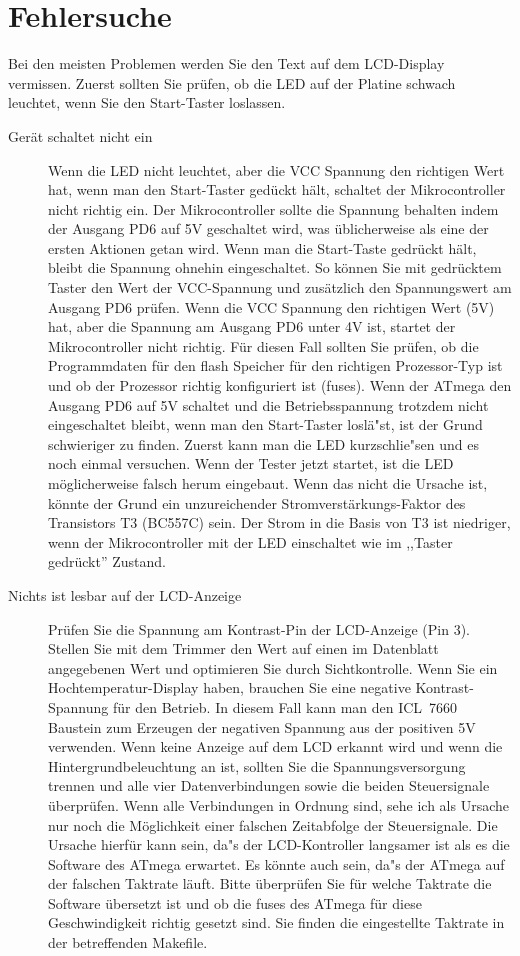 \section{Fehlersuche}
Bei den meisten Problemen werden Sie den Text auf dem LCD-Display vermissen.
Zuerst sollten Sie pr\"ufen, ob die LED auf der Platine schwach leuchtet, wenn Sie den Start-Taster
loslassen.
\begin{description}

\item[Ger\"at schaltet nicht ein]  
Wenn die LED nicht leuchtet, aber die VCC Spannung den richtigen Wert hat, wenn
man den Start-Taster ged\"uckt h\"alt, schaltet der Mikrocontroller nicht richtig ein.
Der Mikrocontroller sollte die Spannung behalten indem der Ausgang PD6 auf 5V
geschaltet wird, was \"ublicherweise als eine der ersten Aktionen getan wird.
Wenn man die Start-Taste gedr\"uckt h\"alt, bleibt die Spannung ohnehin eingeschaltet.
So k\"onnen Sie mit gedr\"ucktem Taster den Wert der VCC-Spannung und zus\"atzlich den Spannungswert am
Ausgang PD6 pr\"ufen.
Wenn die VCC Spannung den richtigen Wert (5V) hat, aber die Spannung am Ausgang
PD6 unter 4V ist, startet der Mikrocontroller nicht richtig.
F\"ur diesen Fall sollten Sie pr\"ufen, ob die Programmdaten f\"ur den flash Speicher
f\"ur den richtigen Prozessor-Typ ist und ob der Prozessor richtig konfiguriert ist (fuses).
Wenn der ATmega den Ausgang PD6 auf 5V schaltet und die Betriebsspannung 
trotzdem nicht eingeschaltet bleibt, wenn man den Start-Taster losl\"a"st, ist der
Grund schwieriger zu finden.
Zuerst kann man die LED kurzschlie"sen und es noch einmal versuchen.
Wenn der Tester jetzt startet, ist die LED m\"oglicherweise falsch herum eingebaut.
Wenn das nicht die Ursache ist, k\"onnte der Grund ein unzureichender Stromverst\"arkungs-Faktor
des Transistors T3 (BC557C) sein.
Der Strom in die Basis von T3 ist niedriger, wenn der Mikrocontroller mit der LED einschaltet
wie im ,,Taster gedr\"uckt'' Zustand.

\item[Nichts ist lesbar auf der LCD-Anzeige] 
Pr\"ufen Sie die Spannung am Kontrast-Pin der LCD-Anzeige (Pin 3).
Stellen Sie mit dem Trimmer den Wert auf einen im Datenblatt angegebenen Wert und optimieren Sie
durch Sichtkontrolle.
Wenn Sie ein Hochtemperatur-Display haben, brauchen Sie eine negative Kontrast-Spannung f\"ur
den Betrieb.
In diesem Fall kann man den ICL~7660 Baustein zum Erzeugen der negativen Spannung aus der
positiven 5V verwenden.
Wenn keine Anzeige auf dem LCD erkannt wird und wenn die Hintergrundbeleuchtung an ist,
sollten Sie die Spannungsversorgung trennen und alle vier Datenverbindungen sowie die 
beiden Steuersignale \"uberpr\"ufen.
Wenn alle Verbindungen in Ordnung sind, sehe ich als Ursache nur noch die M\"oglichkeit einer
falschen Zeitabfolge der Steuersignale.
Die Ursache hierf\"ur kann sein, da"s der LCD-Kontroller langsamer ist als es die Software
des ATmega erwartet. Es k\"onnte auch sein, da"s der ATmega auf der falschen Taktrate l\"auft.
Bitte \"uberpr\"ufen Sie f\"ur welche Taktrate die Software \"ubersetzt ist und ob
die fuses des ATmega f\"ur diese Geschwindigkeit richtig gesetzt sind.
Sie finden die eingestellte Taktrate in der betreffenden Makefile.


\end{description}
